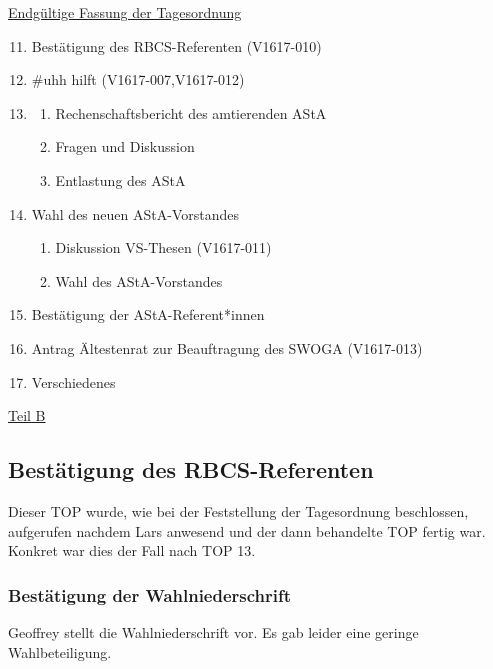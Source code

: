 \documentclass[ngerman,headheight=70pt]{scrartcl}
\begin{document}
    \underline{Endgültige Fassung der Tagesordnung}
    \begin{enumerate}[label={\textbf{Top \theenumi}},leftmargin=*]
        \setcounter{enumi}{10}
        \item Bestätigung des RBCS-Referenten (V1617-010)
        \item \#uhh hilft (V1617-007,V1617-012)
        \item
            \begin{enumerate}
                \item Rechenschaftsbericht des amtierenden AStA
                \item Fragen und Diskussion
                \item Entlastung des AStA
            \end{enumerate}
        \item Wahl des neuen AStA-Vorstandes
            \begin{enumerate}
                \item Diskussion VS-Thesen (V1617-011)
                \item Wahl des AStA-Vorstandes
            \end{enumerate}
        \item Bestätigung der AStA-Referent*innen
        \item Antrag Ältestenrat zur Beauftragung des SWOGA (V1617-013)
        \item Verschiedenes
    \end{enumerate}

    \newpage
    \setcounter{subsection}{10}
    \vspace{1cm}
    {\Large \underline{Teil B}}

    \subsection{Bestätigung des RBCS-Referenten}

    Dieser TOP wurde, wie bei der Feststellung der Tagesordnung beschlossen,
    aufgerufen nachdem Lars anwesend und der dann behandelte TOP fertig war.
    Konkret war dies der Fall nach TOP 13.

    \subsubsection{Bestätigung der Wahlniederschrift}

    Geoffrey stellt die Wahlniederschrift vor. Es gab leider eine geringe
    Wahlbeteiligung.
\end{document}
